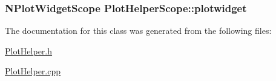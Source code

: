 \hypertarget{class_plot_helper_scope_5297eb536d77915cbbe921d81e20b843}{
\subsubsection[{plotwidget}]{\setlength{\rightskip}{0pt plus 5cm}NPlotWidgetScope {\bf PlotHelperScope::plotwidget}}}
\label{class_plot_helper_scope_5297eb536d77915cbbe921d81e20b843}




The documentation for this class was generated from the following files:\begin{CompactItemize}
\item 
\hyperlink{_plot_helper_8h}{PlotHelper.h}\item 
\hyperlink{_plot_helper_8cpp}{PlotHelper.cpp}\end{CompactItemize}
